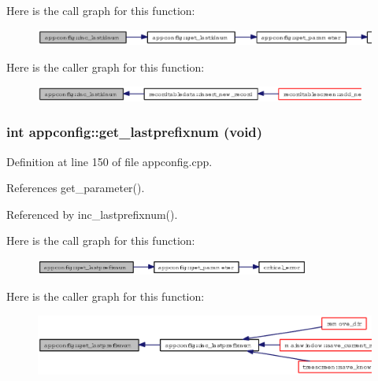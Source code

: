 Here is the call graph for this function:\begin{figure}[H]
\begin{center}
\leavevmode
\includegraphics[width=336pt]{classappconfig_fe3089f67aa81ee6d5e8bd50dfe62e6b_cgraph}
\end{center}
\end{figure}


Here is the caller graph for this function:\begin{figure}[H]
\begin{center}
\leavevmode
\includegraphics[width=308pt]{classappconfig_fe3089f67aa81ee6d5e8bd50dfe62e6b_icgraph}
\end{center}
\end{figure}
\subsubsection{\setlength{\rightskip}{0pt plus 5cm}int appconfig::get\_\-lastprefixnum (void)}\label{classappconfig_3432611171d82a5597bed8102d3590dd}




Definition at line 150 of file appconfig.cpp.

References get\_\-parameter().

Referenced by inc\_\-lastprefixnum().

Here is the call graph for this function:\begin{figure}[H]
\begin{center}
\leavevmode
\includegraphics[width=256pt]{classappconfig_3432611171d82a5597bed8102d3590dd_cgraph}
\end{center}
\end{figure}


Here is the caller graph for this function:\begin{figure}[H]
\begin{center}
\leavevmode
\includegraphics[width=330pt]{classappconfig_3432611171d82a5597bed8102d3590dd_icgraph}
\end{center}
\end{figure}
